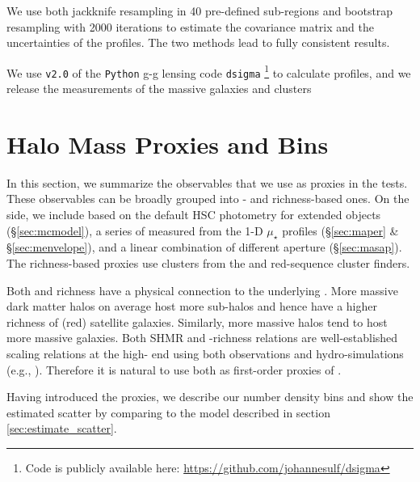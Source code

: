 \documentclass[fleqn,usenatbib,useAMS,english]{mnras}
\begin{document}
    We use both jackknife resampling in 40 pre-defined sub-regions and bootstrap resampling
    with 2000 iterations to estimate the covariance matrix and the uncertainties of the \dsigma{}
    profiles.
    The two methods lead to fully consistent results.

    We use \texttt{v2.0} of the \texttt{Python} g-g lensing code \texttt{dsigma}
    \footnote{Code is publicly available here: \url{https://github.com/johannesulf/dsigma}} to
    calculate \dsigma{} profiles, and we release the \dsigma{} measurements of the massive
    galaxies and clusters 

\section{Halo Mass Proxies and Bins}
    \label{sec:proxies}

    In this section, we summarize the observables that we use as \mvir{} proxies in the \topn{} tests.
    These observables can be broadly grouped into \mstar{}- and richness-based ones.
    On the \mstar{} side, we include \mstar{} based on the default HSC photometry for extended
    objects (\S \ref{sec:mcmodel}), a series of \mstar{} measured from the 1-D $\mu_{\star}$
    profiles (\S \ref{sec:maper} \& \S \ref{sec:menvelope}), and a linear combination of
    different aperture \mstar{} (\S \ref{sec:masap}).
    The richness-based proxies use clusters from the \redm{} and \camira{} red-sequence cluster finders.

    Both \mstar{} and richness have a physical connection to the underlying \mvir{}.
    More massive dark matter halos on average host more sub-halos and hence have a higher richness of
    (red) satellite galaxies.
    Similarly, more massive halos tend to host more massive galaxies.
    Both SHMR and \mvir{}-richness relations are well-established scaling relations at
    the high-\mvir{} end using both observations and hydro-simulations (e.g., \addref{}).
    Therefore it is natural to use both as first-order proxies of \mvir{}.

    Having introduced the proxies, we describe our number density bins and show the estimated
    scatter by comparing to the model described in section \ref{sec:estimate_scatter}.
\end{document}
